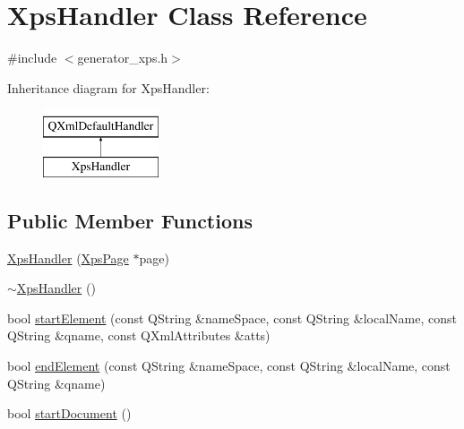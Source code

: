 \hypertarget{classXpsHandler}{\section{Xps\+Handler Class Reference}
\label{classXpsHandler}
}


{\ttfamily \#include $<$generator\+\_\+xps.\+h$>$}

Inheritance diagram for Xps\+Handler\+:\begin{figure}[H]
\begin{center}
\leavevmode
\includegraphics[height=2.000000cm]{classXpsHandler}
\end{center}
\end{figure}
\subsection*{Public Member Functions}
\begin{DoxyCompactItemize}
\item 
\hyperlink{classXpsHandler_ad3ad0c8f97d71b5a953c30b56efbe77b}{Xps\+Handler} (\hyperlink{classXpsPage}{Xps\+Page} $\ast$page)
\item 
\hyperlink{classXpsHandler_a9ef994d1a67b2d9280f8f996cde65ecd}{$\sim$\+Xps\+Handler} ()
\item 
bool \hyperlink{classXpsHandler_a9c43380d1a3c28f39f7061f0636026aa}{start\+Element} (const Q\+String \&name\+Space, const Q\+String \&local\+Name, const Q\+String \&qname, const Q\+Xml\+Attributes \&atts)
\item 
bool \hyperlink{classXpsHandler_a562c36ba3e7e92dedf9cc9b897af5860}{end\+Element} (const Q\+String \&name\+Space, const Q\+String \&local\+Name, const Q\+String \&qname)
\item 
bool \hyperlink{classXpsHandler_afba33984622a2d040c9afef3a5a62510}{start\+Document} ()
\end{DoxyCompactItemize}
